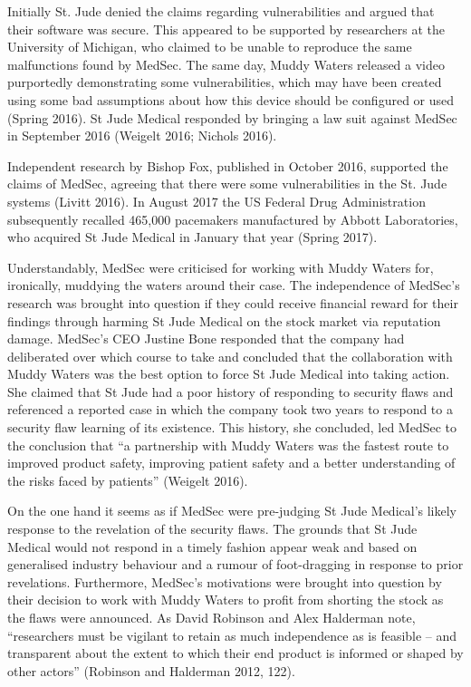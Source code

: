 \documentclass{svjour3}                     %
\begin{document}
Initially St. Jude denied the claims regarding vulnerabilities and argued that their software was secure. This appeared to be supported by researchers at the University of Michigan, who claimed to be unable to reproduce the same malfunctions found by MedSec. The same day, Muddy Waters released a video purportedly demonstrating some vulnerabilities, which may have been created using some bad assumptions about how this device should be configured or used (Spring 2016). St Jude Medical responded by bringing a law suit against MedSec in September 2016 (Weigelt 2016; Nichols 2016).

Independent research by Bishop Fox, published in October 2016, supported the claims of MedSec, agreeing that there were some vulnerabilities in the St. Jude systems (Livitt 2016). In August 2017 the US Federal Drug Administration subsequently recalled 465,000 pacemakers manufactured by Abbott Laboratories, who acquired St Jude Medical in January that year (Spring 2017).

Understandably, MedSec were criticised for working with Muddy Waters for, ironically, muddying the waters around their case. The independence of MedSec’s research was brought into question if they could receive financial reward for their findings through harming St Jude Medical on the stock market via reputation damage. MedSec’s CEO Justine Bone responded that the company had deliberated over which course to take and concluded that the collaboration with Muddy Waters was the best option to force St Jude Medical into taking action.  She claimed that St Jude had a poor history of responding to security flaws and referenced a reported case in which the company took two years to respond to a security flaw learning of its existence.  This history, she concluded, led MedSec to the conclusion that “a partnership with Muddy Waters was the fastest route to improved product safety, improving patient safety and a better understanding of the risks faced by patients” (Weigelt 2016). 

On the one hand it seems as if MedSec were pre-judging St Jude Medical’s likely response to the revelation of the security flaws. The grounds that St Jude Medical would not respond in a timely fashion appear weak and based on generalised industry behaviour and a rumour of foot-dragging in response to prior revelations. Furthermore, MedSec’s motivations were brought into question by their decision to work with Muddy Waters to profit from shorting the stock as the flaws were announced. As David Robinson and Alex Halderman note, “researchers must be vigilant to retain as much independence as is feasible – and transparent about the extent to which their end product is informed or shaped by other actors” (Robinson and Halderman 2012, 122). 
\end{document}
